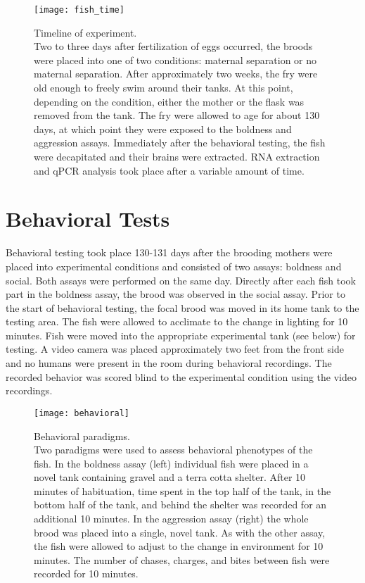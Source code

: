 \documentclass[12pt,twoside]{reedthesis}
\begin{document}
\begin{figure}[htbp] 
\begin{centering} 
\texttt{[image: fish\_time]}
\caption[Timeline of experiment]{\footnotesize{Timeline of experiment.\\ Two to
    three days after fertilization of eggs occurred, the broods were placed into
  one of two conditions: maternal separation or no maternal separation. After
  approximately two weeks, the fry were old enough to freely swim around their
  tanks. At this point, depending on the condition, either the mother or the
  flask was removed from the tank. The fry were allowed to age for about 130
  days, at which point they were exposed to the boldness and aggression assays.
  Immediately after the behavioral testing, the fish were decapitated and their
  brains were extracted. RNA extraction and qPCR analysis took place after a variable
  amount of time.}} 
\label{subd}
\end{centering} 
\end{figure}

\section{Behavioral Tests}

Behavioral testing took place 130-131 days after the brooding mothers were
placed into experimental conditions and consisted of two assays: boldness and social. Both assays were performed on the same day.
Directly after each fish took part in the boldness assay, the brood was observed in the
social assay.
Prior to the start of behavioral testing, the focal brood was moved in its home tank to the
testing area. The fish were allowed to acclimate to the change in lighting for 10
minutes. Fish were moved into the appropriate experimental tank (see below) for
testing. A video camera was placed approximately two
feet from the front side and no humans were present in the room during behavioral
recordings. The recorded behavior was scored blind to the experimental condition using the video recordings.

\begin{figure}[htbp] 
\begin{centering} 
\texttt{[image: behavioral]}
\caption[Behavioral paradigms]{\footnotesize{Behavioral paradigms. \\ Two paradigms were used to assess
  behavioral phenotypes of the fish. In the boldness assay (left) individual
  fish were placed in a novel tank containing gravel and a terra cotta shelter.
  After 10 minutes of habituation, time spent in the top half of the tank, in
  the bottom half of the tank, and behind the shelter was recorded for an
  additional 10 minutes. In the
  aggression assay (right) the whole brood was placed into a single, novel tank.
  As with the other assay, the fish were allowed to adjust to the change in
  environment for 10 minutes.
The number of chases, charges, and bites between fish were recorded for 10 minutes.}}
\label{subd}
\end{centering} 
\end{figure}
\end{document}
